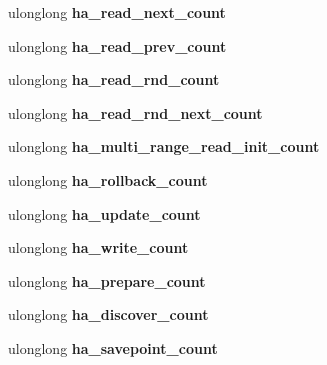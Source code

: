 \begin{DoxyCompactItemize}
ulonglong {\bfseries ha\+\_\+read\+\_\+next\+\_\+count}
\item 
\mbox{\label{structsystem__status__var_aaf3eb8dba11b40a468baa5298715c4cc}} 
ulonglong {\bfseries ha\+\_\+read\+\_\+prev\+\_\+count}
\item 
\mbox{\label{structsystem__status__var_a230c9a89b092f7db50d80b2b6f244f22}} 
ulonglong {\bfseries ha\+\_\+read\+\_\+rnd\+\_\+count}
\item 
\mbox{\label{structsystem__status__var_ae45da24593d9131e406e61cf6ca439f9}} 
ulonglong {\bfseries ha\+\_\+read\+\_\+rnd\+\_\+next\+\_\+count}
\item 
\mbox{\label{structsystem__status__var_a1e3302f6c303829ac3d72861f0ba1d54}} 
ulonglong {\bfseries ha\+\_\+multi\+\_\+range\+\_\+read\+\_\+init\+\_\+count}
\item 
\mbox{\label{structsystem__status__var_a209f8da1957577e8e4fd83496b7956b6}} 
ulonglong {\bfseries ha\+\_\+rollback\+\_\+count}
\item 
\mbox{\label{structsystem__status__var_ad9ada8f6cd0d7d7deee4ddc14d07cc28}} 
ulonglong {\bfseries ha\+\_\+update\+\_\+count}
\item 
\mbox{\label{structsystem__status__var_a845ab28cbc5e9602dedc9c42632d28fd}} 
ulonglong {\bfseries ha\+\_\+write\+\_\+count}
\item 
\mbox{\label{structsystem__status__var_a849a1e71ac1a70aef6e0b8d3fa73ba6a}} 
ulonglong {\bfseries ha\+\_\+prepare\+\_\+count}
\item 
\mbox{\label{structsystem__status__var_aa7b46fba145905e14b3ee408457a1148}} 
ulonglong {\bfseries ha\+\_\+discover\+\_\+count}
\item 
\mbox{\label{structsystem__status__var_a9216229b5c79bd925156e91f6e4a1c42}} 
ulonglong {\bfseries ha\+\_\+savepoint\+\_\+count}
\item 

\end{DoxyCompactItemize}
